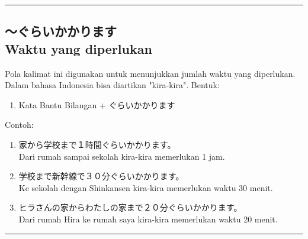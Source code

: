 \vspace{0.2cm}\hrule height 1pt\vspace{0.2cm}


\subsection*{
    ～ぐらいかかります \\
    Waktu yang diperlukan
}
Pola kalimat ini digunakan untuk menunjukkan jumlah waktu 
yang diperlukan. Dalam bahasa Indonesia bisa diartikan 
"kira-kira".
Bentuk:
\begin{enumerate}
    \item Kata Bantu Bilangan + ぐらいかかります
\end{enumerate}
Contoh: 
\begin{enumerate}
    \item 家から学校まで１時間ぐらいかかります。
    \\ Dari rumah sampai sekolah kira-kira memerlukan 1 jam.
    \item 学校まで新幹線で３０分ぐらいかかります。
    \\ Ke sekolah dengan Shinkansen kira-kira memerlukan waktu 30 menit.
    \item ヒラさんの家からわたしの家まで２０分ぐらいかかります。
    \\ Dari rumah Hira ke rumah saya kira-kira memerlukan waktu 20 menit.
\end{enumerate}

\vspace{0.2cm}\hrule height 1pt\vspace{0.2cm}